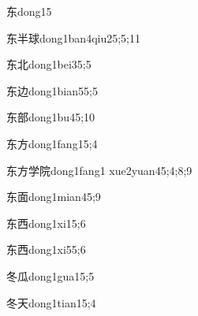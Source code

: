 \begin{verbete}{东}{dong1}{5}
\end{verbete}

\begin{verbete}{东半球}{dong1ban4qiu2}{5;5;11}
\end{verbete}

\begin{verbete}{东北}{dong1bei3}{5;5}
\end{verbete}

\begin{verbete}{东边}{dong1bian5}{5;5}
\end{verbete}

\begin{verbete}{东部}{dong1bu4}{5;10}
\end{verbete}

\begin{verbete}{东方}{dong1fang1}{5;4}
\end{verbete}

\begin{verbete}{东方学院}{dong1fang1 xue2yuan4}{5;4;8;9}
\end{verbete}

\begin{verbete}{东面}{dong1mian4}{5;9}
\end{verbete}

\begin{verbete}{东西}{dong1xi1}{5;6}
\end{verbete}

\begin{verbete}{东西}{dong1xi5}{5;6}
\end{verbete}

\begin{verbete}{冬瓜}{dong1gua1}{5;5}
\end{verbete}

\begin{verbete}{冬天}{dong1tian1}{5;4}
\end{verbete}

